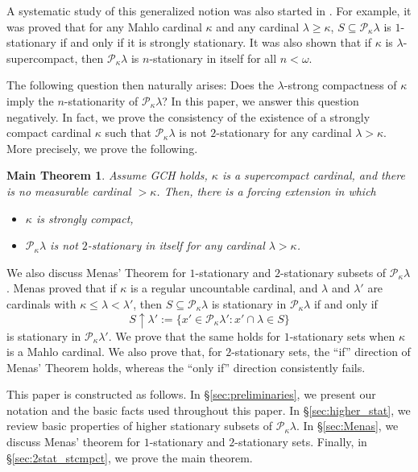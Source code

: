 \documentclass[a4paper,12pt,reqno,oneside]{amsart}
\theoremstyle{plain}
\newtheorem*{mthm}{Main Theorem}
\newcommand{\mcal}{\mathcal}
\begin{document}
A systematic study of this generalized notion was also started in \cite{CLHZ, T}. For example, it was proved that for any Mahlo cardinal $\kappa$ and any cardinal $\lambda \geq \kappa$, $S \subseteq \mcal{P}_\kappa \lambda$ is $1$-stationary if and only if it is strongly stationary. It was also shown that if $\kappa$ is $\lambda$-supercompact, then $\mcal{P}_\kappa \lambda$ is $n$-stationary in itself for all $n < \omega$.

The following question then naturally arises: Does the $\lambda$-strong compactness of $\kappa$ imply the $n$-stationarity of $\mcal{P}_\kappa \lambda$? In this paper, we answer this question negatively. In fact, we prove the consistency of the existence of a strongly compact cardinal $\kappa$ such that $\mcal{P}_\kappa \lambda$ is not $2$-stationary for any cardinal $\lambda > \kappa$. More precisely, we prove the following.

\begin{mthm}
Assume GCH holds, $\kappa$ is a supercompact cardinal, and there is no measurable cardinal $> \kappa$. Then, there is a forcing extension in which
\begin{itemize}
\item[(I)] $\kappa$ is strongly compact,
\item[(II)] $\mcal{P}_\kappa \lambda$ is not $2$-stationary in itself for any cardinal $\lambda > \kappa$.
\end{itemize}
\end{mthm}

We also discuss Menas' Theorem for $1$-stationary and $2$-stationary subsets of $\mcal{P}_\kappa \lambda$. Menas \cite{Me} proved that if $\kappa$ is a regular uncountable cardinal, and $\lambda$ and $\lambda '$ are cardinals with $\kappa \leq \lambda < \lambda '$, then $S \subseteq \mcal{P}_\kappa \lambda$ is stationary in $\mcal{P}_\kappa \lambda$ if and only if
\[
S \uparrow \lambda ' := \{ x' \in \mcal{P}_\kappa \lambda ' : x' \cap \lambda \in S \}
\]
is stationary in $\mcal{P}_\kappa \lambda '$. We prove that the same holds for $1$-stationary sets when $\kappa$ is a Mahlo cardinal. We also prove that, for $2$-stationary sets, the ``if'' direction of Menas' Theorem holds, whereas the ``only if'' direction consistently fails.

This paper is constructed as follows. In \S \ref{sec:preliminaries}, we present our notation and the basic facts used throughout this paper. In \S \ref{sec:higher_stat}, we review basic properties of higher stationary subsets of $\mcal{P}_\kappa \lambda$. In \S \ref{sec:Menas}, we discuss Menas' theorem for $1$-stationary and $2$-stationary sets. Finally, in \S \ref{sec:2stat_stcmpct}, we prove the main theorem.
\end{document}
